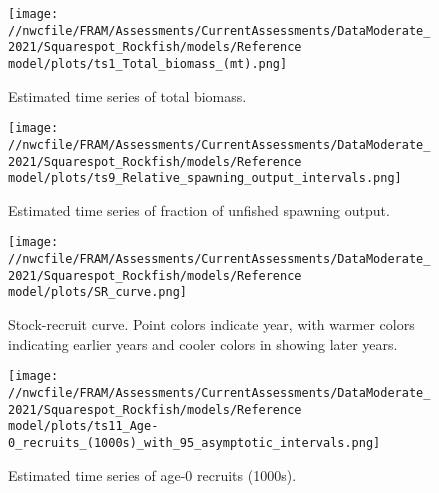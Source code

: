\documentclass[11pt,
  english,
  a4paper,
]{article}
\begin{document}
\tagmcend\tagstructend


\begin{figure}
\centering
\texttt{[image: //nwcfile/FRAM/Assessments/CurrentAssessments/DataModerate\_2021/Squarespot\_Rockfish/models/Reference model/plots/ts1\_Total\_biomass\_(mt).png]}
\caption{Estimated time series of total biomass.\label{fig:tot-bio}}
\end{figure}

\tagmcend\tagstructend


\begin{figure}
\centering
\texttt{[image: //nwcfile/FRAM/Assessments/CurrentAssessments/DataModerate\_2021/Squarespot\_Rockfish/models/Reference model/plots/ts9\_Relative\_spawning\_output\_intervals.png]}
\caption{Estimated time series of fraction of unfished spawning output.\label{fig:depl}}
\end{figure}

\tagmcend\tagstructend


\begin{figure}
\centering
\texttt{[image: //nwcfile/FRAM/Assessments/CurrentAssessments/DataModerate\_2021/Squarespot\_Rockfish/models/Reference model/plots/SR\_curve.png]}
\caption{Stock-recruit curve. Point colors indicate year, with warmer colors indicating earlier years and cooler colors in showing later years.\label{fig:bh-curve}}
\end{figure}

\tagmcend\tagstructend


\begin{figure}
\centering
\texttt{[image: //nwcfile/FRAM/Assessments/CurrentAssessments/DataModerate\_2021/Squarespot\_Rockfish/models/Reference model/plots/ts11\_Age-0\_recruits\_(1000s)\_with\_95\_asymptotic\_intervals.png]}
\caption{Estimated time series of age-0 recruits (1000s).\label{fig:recruits}}
\end{figure}
\end{document}
